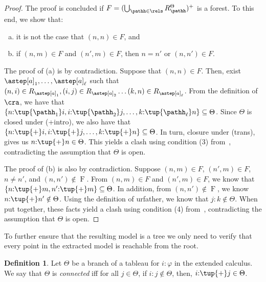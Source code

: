 \documentclass[10pt,a4paper]{amsart}
\theoremstyle{definition}
\newtheorem{defi}[thm]{Definition}
\theoremstyle{remark}
\begin{document}
\begin{proof}
    The proof is concluded if $F = (\bigcup_{\pathh\in\rels} R_{\pathh}^{\Theta})^{+}$ is a forest.
    To this end, we show that:
    \begin{enumerate}[(a)]
    \item it is not the case that $(n,n) \in \mathbin{F}$, and
    \item if $(n,m)\in \mathbin{F}$ and $(n',m) \in \mathbin{F}$, then $n = n'$ or $(n,n') \in \mathbin{F}$.
    \end{enumerate} 

    The proof of (a) is by contradiction.
    Suppose that $(n,n)\in \mathbin{F}$.
    Then, exist $\astep[a]_1,\ldots,\astep[a]_{\ell}$ such that
        $(n,i)\in R_{\astep[a]_1}, (i,j)\in R_{\astep[a]_2} \ldots (k,n)\in R_{\astep[a]_{\ell}}$.
    From the definition of $\cra$, we have that ${\{n{:}\tup{\pathh_1} i, i{:}\tup{\pathh_2}j,\ldots,k{:}\tup{\pathh_{\ell}} n\}\subseteq\Theta}$.
    Since $\Theta$ is closed under (+intro), we also have that $\{n{:}\tup{+} i, i{:}\tup{+}j,\ldots,k{:}\tup{+} n\}\subseteq\Theta$.
    In turn, closure under (trans), gives us ${n{:}\tup{+} n}\in \Theta$.
    This yields a clash using condition (3) from~, contradicting the assumption that $\Theta$ is open.

    The proof of (b) is also by contradiction.
    Suppose $(n,m)\in \mathbin{F}$, $(n',m) \in \mathbin{F}$, $n \neq n'$, and $(n,n')\notin\mathrel{F}$.
    From $(n,m)\in \mathbin{F}$ and $(n',m)\in \mathbin{F}$, we know that $\{n{:}\tup{+}m,n'{:}\tup{+}m\} \subseteq \Theta$.
    In addition, from $(n,n')\notin \mathrel{F}$, we know $n{:}\tup{+}n' \notin \Theta$.
    Using the definition of urfather, we know that $j{:}k \notin \Theta$.
    When put together, these facts yield a clash using condition (4) from~, contradicting the assumption that $\Theta$ is open.
\end{proof}

To further ensure that the resulting model is a tree we only need 
to verify that every point in the extracted model is reachable from 
the root. 

\begin{defi}
    \label{def:connected}
    Let $\Theta$ be a branch of a tableau for $i{:}\varphi$ in the extended calculus. We say that $\Theta$
    is {\em connected} iff for all $j\in\Theta$, if $i{:}j \notin \Theta$, then, $i{:}\tup{+}j \in \Theta$.
\end{defi}
\end{document}
